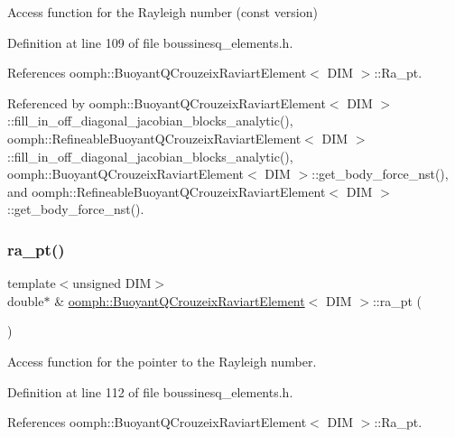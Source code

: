 Access function for the Rayleigh number (const version) 



Definition at line 109 of file boussinesq\+\_\+elements.\+h.



References oomph\+::\+Buoyant\+Q\+Crouzeix\+Raviart\+Element$<$ D\+I\+M $>$\+::\+Ra\+\_\+pt.



Referenced by oomph\+::\+Buoyant\+Q\+Crouzeix\+Raviart\+Element$<$ D\+I\+M $>$\+::fill\+\_\+in\+\_\+off\+\_\+diagonal\+\_\+jacobian\+\_\+blocks\+\_\+analytic(), oomph\+::\+Refineable\+Buoyant\+Q\+Crouzeix\+Raviart\+Element$<$ D\+I\+M $>$\+::fill\+\_\+in\+\_\+off\+\_\+diagonal\+\_\+jacobian\+\_\+blocks\+\_\+analytic(), oomph\+::\+Buoyant\+Q\+Crouzeix\+Raviart\+Element$<$ D\+I\+M $>$\+::get\+\_\+body\+\_\+force\+\_\+nst(), and oomph\+::\+Refineable\+Buoyant\+Q\+Crouzeix\+Raviart\+Element$<$ D\+I\+M $>$\+::get\+\_\+body\+\_\+force\+\_\+nst().

\mbox{\label{classoomph_1_1BuoyantQCrouzeixRaviartElement_afa4d4ff16fa307b16feab1de7aaa90b6}} 
\subsubsection{\texorpdfstring{ra\+\_\+pt()}{ra\_pt()}}
{\footnotesize\ttfamily template$<$unsigned D\+IM$>$ \\
double$\ast$ \& \hyperlink{classoomph_1_1BuoyantQCrouzeixRaviartElement}{oomph\+::\+Buoyant\+Q\+Crouzeix\+Raviart\+Element}$<$ D\+IM $>$\+::ra\+\_\+pt (\begin{DoxyParamCaption}{ }\end{DoxyParamCaption})\hspace{0.3cm}{\ttfamily [inline]}}



Access function for the pointer to the Rayleigh number. 



Definition at line 112 of file boussinesq\+\_\+elements.\+h.



References oomph\+::\+Buoyant\+Q\+Crouzeix\+Raviart\+Element$<$ D\+I\+M $>$\+::\+Ra\+\_\+pt.

